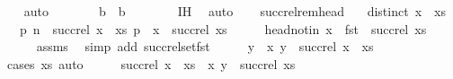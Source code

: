 \begin{isabellebody}
\ {}\ \isamarkupfalse%
\ auto\isanewline
\ \ \ \ \isamarkupfalse%
\ \isamarkupfalse%
\ {\isachardoublequoteopen}b{}\ {\isacharequal}\ b{}{\isachardoublequoteclose}\isanewline
\ \ \ \ \ \ \isamarkupfalse%
\ {\isachardoublequoteopen}{}{\isachardot}IH{\isachardoublequoteclose}\ \isamarkupfalse%
\ auto\isanewline
\ \ \isamarkupfalse%
\isanewline
{}\isamarkupfalse%
%
\endisatagproof
{\isafoldproof}%
%
\isadelimproof
\isanewline
%
\endisadelimproof
\isanewline
{}\isamarkupfalse%
\ succ{\isacharunderscore}rel{\isacharunderscore}rem{\isacharunderscore}head{\isacharcolon}\isanewline
\ \ \ {\isachardoublequoteopen}distinct\ {\isacharparenleft}x\ {\isacharhash}\ xs{\isacharparenright}{\isachardoublequoteclose}\isanewline
\ \ \ {\isachardoublequoteopen}{\isacharbraceleft}{\isacharparenleft}p{\isacharcomma}\ n{\isacharparenright}\ {\isasymin}\ succ{\isacharunderscore}rel\ {\isacharparenleft}x\ {\isacharhash}\ xs{\isacharparenright}{\isachardot}\ p\ {\isasymnoteq}\ x{\isacharbraceright}\ {\isacharequal}\ succ{\isacharunderscore}rel\ xs{\isachardoublequoteclose}\isanewline
%
\isadelimproof
%
\endisadelimproof
%
\isatagproof
{}\isamarkupfalse%
\ {\isacharminus}\isanewline
\ \ \isamarkupfalse%
\ head{\isacharunderscore}notin{\isacharcolon}\ {\isachardoublequoteopen}x\ {\isasymnotin}\ fst\ {\isacharbackquote}\ succ{\isacharunderscore}rel\ xs{\isachardoublequoteclose}\isanewline
\ \ \ \ \isamarkupfalse%
\ assms\ \isamarkupfalse%
\ {\isacharparenleft}simp\ add{\isacharcolon}\ succ{\isacharunderscore}rel{\isacharunderscore}set{\isacharunderscore}fst{\isacharparenright}\isanewline
\ \ \isamarkupfalse%
\ \isamarkupfalse%
\ y\ \ {\isachardoublequoteopen}{\isacharparenleft}x{\isacharcomma}\ y{\isacharparenright}\ {\isasymin}\ succ{\isacharunderscore}rel\ {\isacharparenleft}x\ {\isacharhash}\ xs{\isacharparenright}{\isachardoublequoteclose}\isanewline
\ \ \ \ \isamarkupfalse%
\ {\isacharparenleft}cases\ xs{\isacharcomma}\ auto{\isacharparenright}\isanewline
\ \ \isamarkupfalse%
\ \isamarkupfalse%
\ {\isachardoublequoteopen}succ{\isacharunderscore}rel\ {\isacharparenleft}x\ {\isacharhash}\ xs{\isacharparenright}\ {\isacharequal}\ {\isacharbraceleft}{\isacharparenleft}x{\isacharcomma}\ y{\isacharparenright}{\isacharbraceright}\ {\isasymunion}\ succ{\isacharunderscore}rel\ xs{\isachardoublequoteclose}\isanewline

\end{isabellebody}
